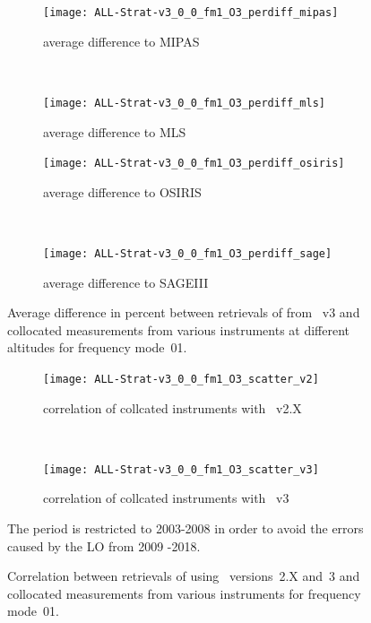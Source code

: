 \begin{figure}[tbhp]
    \centering
    \begin{subfigure}[b]{0.49\textwidth}
        \texttt{[image: ALL-Strat-v3\_0\_0\_fm1\_O3\_perdiff\_mipas]}
        \caption{average difference to MIPAS}
        \label{fig:fm01:O3:profiles:MIPAS}
    \end{subfigure}
    \,
    \begin{subfigure}[b]{0.49\textwidth}
        \texttt{[image: ALL-Strat-v3\_0\_0\_fm1\_O3\_perdiff\_mls]}
        \caption{average difference to MLS}
        \label{fig:fm01:O3:profiles:MLS}
    \end{subfigure}

    \begin{subfigure}[b]{0.49\textwidth}
        \texttt{[image: ALL-Strat-v3\_0\_0\_fm1\_O3\_perdiff\_osiris]}
        \caption{average difference to OSIRIS}
        \label{fig:fm01:O3:profiles:OSIRIS}
    \end{subfigure}
    \,
    \begin{subfigure}[b]{0.49\textwidth}
        \texttt{[image: ALL-Strat-v3\_0\_0\_fm1\_O3\_perdiff\_sage]}
        \caption{average difference to SAGEIII}
        \label{fig:fm01:O3:profiles:SAGEIII}
    \end{subfigure}
    \caption{Average difference in percent between retrievals of 
    from \smr~v3 and collocated measurements from various instruments at
    different altitudes for frequency mode~01.}
    \label{fig:fm01:O3:profiles}
\end{figure}

\begin{figure}[tbhp]
    \centering
    \begin{subfigure}[b]{0.49\textwidth}
        \texttt{[image: ALL-Strat-v3\_0\_0\_fm1\_O3\_scatter\_v2]}
        \caption{correlation of collcated instruments with \smr~v2.X}
        \label{fig:fm01:O3:scatter:v2}
    \end{subfigure}
    \,
    \begin{subfigure}[b]{0.49\textwidth}
        \texttt{[image: ALL-Strat-v3\_0\_0\_fm1\_O3\_scatter\_v3]}
        \caption{correlation of collcated instruments with \smr~v3}
        \label{fig:fm01:O3:scatter:v3}
    \end{subfigure}
    \caption{Correlation between retrievals of  using \smr\
    versions~2.X and~3 and collocated measurements from various instruments
    for frequency mode~01.} The period is restricted to 2003-2008 in order to avoid the errors caused by the LO from 2009 -2018.
    \label{fig:fm01:O3:scatter}
\end{figure}

